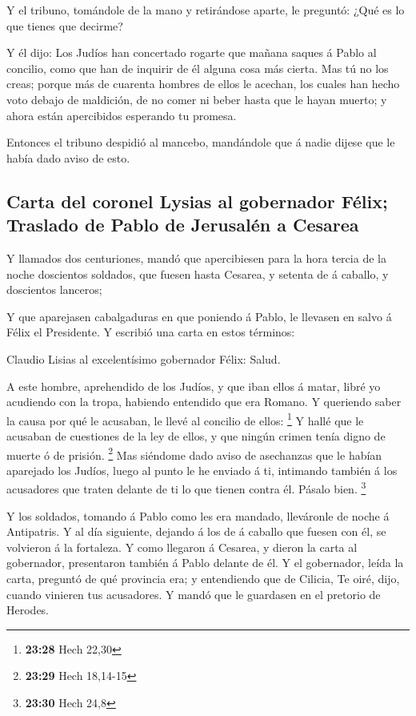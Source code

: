  Y el tribuno, tomándole de la mano y retirándose aparte,
le preguntó: ¿Qué es lo que tienes que decirme?

 Y él dijo: Los Judíos han concertado rogarte que mañana
saques á Pablo al concilio, como que han de inquirir de él alguna cosa
más cierta.  Mas tú no los creas; porque más de cuarenta
hombres de ellos le acechan, los cuales han hecho voto debajo de
maldición, de no comer ni beber hasta que le hayan muerto; y ahora están
apercibidos esperando tu promesa.

 Entonces el tribuno despidió al mancebo, mandándole que á
nadie dijese que le había dado aviso de esto.

\hypertarget{carta-del-coronel-lysias-al-gobernador-fuxe9lix-traslado-de-pablo-de-jerusaluxe9n-a-cesarea}{%
\subsection{Carta del coronel Lysias al gobernador Félix; Traslado de
Pablo de Jerusalén a
Cesarea}\label{carta-del-coronel-lysias-al-gobernador-fuxe9lix-traslado-de-pablo-de-jerusaluxe9n-a-cesarea}}

 Y llamados dos centuriones, mandó que apercibiesen para la
hora tercia de la noche doscientos soldados, que fuesen hasta Cesarea, y
setenta de á caballo, y doscientos lanceros;

 Y que aparejasen cabalgaduras en que poniendo á Pablo, le
llevasen en salvo á Félix el Presidente.  Y escribió una
carta en estos términos:

 Claudio Lisias al excelentísimo gobernador Félix: Salud.

 A este hombre, aprehendido de los Judíos, y que iban ellos
á matar, libré yo acudiendo con la tropa, habiendo entendido que era
Romano.  Y queriendo saber la causa por qué le acusaban, le
llevé al concilio de ellos: \footnote{\textbf{23:28} Hech 22,30}
 Y hallé que le acusaban de cuestiones de la ley de ellos,
y que ningún crimen tenía digno de muerte ó de prisión. \footnote{\textbf{23:29}
  Hech 18,14-15}  Mas siéndome dado aviso de asechanzas que
le habían aparejado los Judíos, luego al punto le he enviado á ti,
intimando también á los acusadores que traten delante de ti lo que
tienen contra él. Pásalo bien. \footnote{\textbf{23:30} Hech 24,8}

 Y los soldados, tomando á Pablo como les era mandado,
lleváronle de noche á Antipatris.  Y al día siguiente,
dejando á los de á caballo que fuesen con él, se volvieron á la
fortaleza.  Y como llegaron á Cesarea, y dieron la carta al
gobernador, presentaron también á Pablo delante de él.  Y
el gobernador, leída la carta, preguntó de qué provincia era; y
entendiendo que de Cilicia,  Te oiré, dijo, cuando vinieren
tus acusadores. Y mandó que le guardasen en el pretorio de Herodes.

